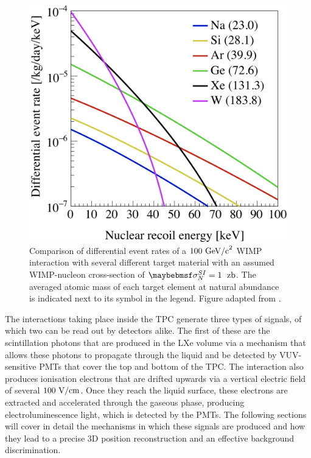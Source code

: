 \begin{figure}[hb!]
    \begin{center}
        \includegraphics[scale=0.30]{Chapter_2/Figures/SI_nuclear_recoil_rates.png}
        \caption[Comparison of differential event rates of a $100 \; \MathText{GeV/c}^{2}$ WIMP interaction with several different target material, for an assumed cross-section of $\sigma^{SI}_{N} = 1 \; \MathText{zb}$]%
        {Comparison of differential event rates of a $100 \text{ GeV/c}^{2}$ WIMP interaction with several different target material with an assumed WIMP-nucleon cross-section of $\sigma^{SI}_{N} = 1 \; \MathText{ zb}$. The averaged atomic mass of each target element at natural abundance is indicated next to its symbol in the legend. Figure adapted from \cite{ibles}.}
        \label{fig:nuclear_recoil_rates}
        \end{center}
\end{figure}
%

The interactions taking place inside the TPC generate three types of signals, of which two can be read out by detectors alike. The first of these are the scintillation photons that are produced in the LXe volume via a mechanism that allows these photons to propagate through the liquid and be detected by VUV-sensitive PMTs that cover the top and bottom of the TPC. The interaction also produces ionisation electrons that are drifted upwards via a vertical electric field of several $100 \text{ V/cm}$. Once they reach the liquid surface, these electrons are extracted and accelerated through the gaseous phase, producing electroluminescence light, which is detected by the PMTs. The following sections will cover in detail the mechanisms in which these signals are produced and how they lead to a precise 3D position reconstruction and an effective background discrimination. 


